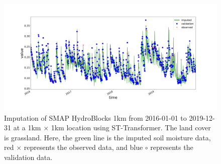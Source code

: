 \documentclass[review]{elsarticle}
\begin{document}
 
\begin{figure}
\centering
\includegraphics[width=\textwidth]{figure/smap_hydroblocks.png}
\caption{Imputation of SMAP HydroBlocks 1km from 2016-01-01 to 2019-12-31 at a 1km $\times$ 1km location using ST-Transformer. The land cover is grassland. Here, the green line is the imputed soil moisture data, red $\times$ represents the observed data, and blue $\circ$ represents the validation data.}
\label{fig: smap_hydroblock}
\end{figure}
\end{document}
